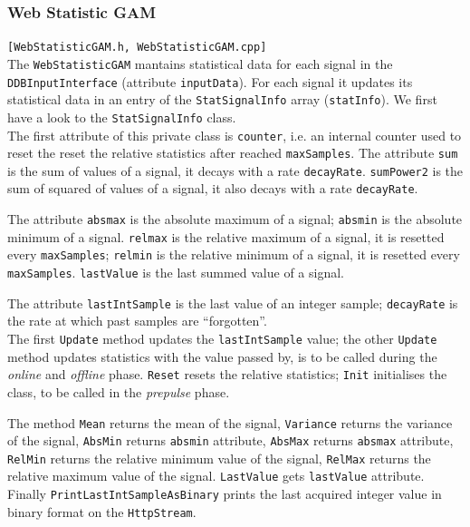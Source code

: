 \subsubsection{Web Statistic GAM}
\texttt{[WebStatisticGAM.h, WebStatisticGAM.cpp]} \\
The \texttt{WebStatisticGAM} mantains statistical data for each signal in the \texttt{DDBInputInterface} (attribute \texttt{inputData}). For each signal it updates its statistical data in an entry of the \texttt{StatSignalInfo} array (\texttt{statInfo}). We first have a look to the \texttt{StatSignalInfo} class. \\


The first attribute of this private class is \texttt{counter}, i.e. an internal counter used to reset the reset the relative statistics after reached \texttt{maxSamples}. The attribute \texttt{sum} is the sum of values of a signal, it decays with a rate \texttt{decayRate}. \texttt{sumPower2} is the sum of squared of values of a signal, it also decays with a rate \texttt{decayRate}. 

The attribute \texttt{absmax} is the absolute maximum of a signal; \texttt{absmin} is the absolute minimum of a signal. \texttt{relmax} is the relative maximum of a signal, it is resetted every \texttt{maxSamples}; \texttt{relmin} is the relative minimum of a signal, it is resetted every \texttt{maxSamples}. \texttt{lastValue} is the last summed value of a signal.

The attribute \texttt{lastIntSample} is the last value of an integer sample; \texttt{decayRate} is the rate at which past samples are ``forgotten''. \\


The first \texttt{Update} method updates the \texttt{lastIntSample} value; the other \texttt{Update} method updates statistics with the value passed by, is to be called during the \textit{online} and \textit{offline} phase. \texttt{Reset} resets the relative statistics; \texttt{Init} initialises the class, to be called in the \textit{prepulse} phase. 

The method \texttt{Mean} returns the mean of the signal, \texttt{Variance} returns the variance of the signal, \texttt{AbsMin} returns \texttt{absmin} attribute, \texttt{AbsMax} returns \texttt{absmax} attribute, \texttt{RelMin} returns the relative minimum value of the signal, \texttt{RelMax} returns the relative maximum value of the signal. \texttt{LastValue} gets \texttt{lastValue} attribute. Finally \texttt{PrintLastIntSampleAsBinary} prints the last acquired integer value in binary format on the \texttt{HttpStream}.

